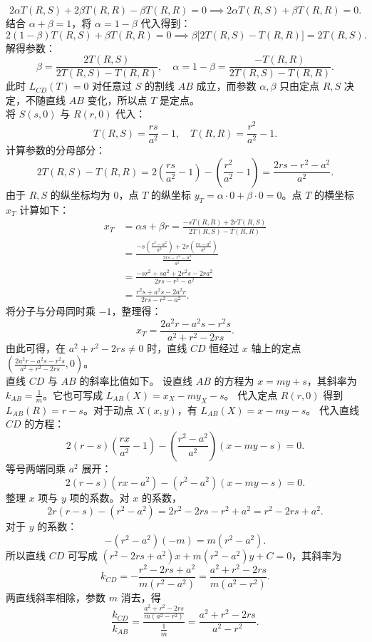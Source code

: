 \begin{solution}
\[ 2\alpha T(R, S) + 2\beta T(R, R) - \beta T(R, R) = 0 \implies 2\alpha T(R, S) + \beta T(R, R) = 0. \]
结合 $\alpha + \beta = 1$，将 $\alpha = 1 - \beta$ 代入得到：
\[ 2(1 - \beta) T(R, S) + \beta T(R, R) = 0 \implies \beta \big[2T(R, S) - T(R, R)\big] = 2T(R, S). \]
解得参数：
\[ \beta = \frac{2T(R, S)}{2T(R, S) - T(R, R)}, \quad \alpha = 1 - \beta = \frac{-T(R, R)}{2T(R, S) - T(R, R)}. \]
此时 $L_{CD}(T)=0$ 对任意过 $S$ 的割线 $AB$ 成立，而参数 $\alpha,\beta$ 只由定点 $R,S$ 决定，不随直线 $AB$ 变化，所以点 $T$ 是定点。\\
将 $S(s, 0)$ 与 $R(r, 0)$ 代入：
\[ T(R, S) = \frac{rs}{a^2} - 1, \quad T(R, R) = \frac{r^2}{a^2} - 1. \]
计算参数的分母部分：
\[ 2T(R, S) - T(R, R) = 2\left(\frac{rs}{a^2} - 1\right) - \left(\frac{r^2}{a^2} - 1\right) = \frac{2rs - r^2 - a^2}{a^2}. \]
由于 $R, S$ 的纵坐标均为 $0$，点 $T$ 的纵坐标 $y_T = \alpha \cdot 0 + \beta \cdot 0 = 0$。点 $T$ 的横坐标 $x_T$ 计算如下：
\begin{align*}
x_T &= \alpha s + \beta r = \frac{-s T(R, R) + 2r T(R, S)}{2T(R, S) - T(R, R)} \\
&= \frac{-s\left(\frac{r^2 - a^2}{a^2}\right) + 2r\left(\frac{rs - a^2}{a^2}\right)}{\frac{2rs - r^2 - a^2}{a^2}} \\
&= \frac{-sr^2 + sa^2 + 2r^2s - 2ra^2}{2rs - r^2 - a^2} \\
&= \frac{r^2s + a^2s - 2a^2r}{2rs - r^2 - a^2}.
\end{align*}
将分子与分母同时乘 $-1$，整理得：
\[ x_T = \frac{2a^2r - a^2s - r^2s}{a^2 + r^2 - 2rs}. \]
由此可得，在 $a^2 + r^2 - 2rs \neq 0$ 时，直线 $CD$ 恒经过 $x$ 轴上的定点 $\left( \frac{2a^2r - a^2s - r^2s}{a^2 + r^2 - 2rs}, 0 \right)$。\\
直线 $CD$ 与 $AB$ 的斜率比值如下。
设直线 $AB$ 的方程为 $x = my + s$，其斜率为 $k_{AB} = \frac{1}{m}$。它也可写成 $L_{AB}(X) = x_X - m y_X - s$。
代入定点 $R(r, 0)$ 得到 $L_{AB}(R) = r - s$。对于动点 $X(x, y)$，有 $L_{AB}(X) = x - my - s$。
代入直线 $CD$ 的方程：
\[ 2(r - s)\left(\frac{rx}{a^2} - 1\right) - \left(\frac{r^2 - a^2}{a^2}\right)(x - my - s) = 0. \]
等号两端同乘 $a^2$ 展开：
\[ 2(r - s)(rx - a^2) - (r^2 - a^2)(x - my - s) = 0. \]
整理 $x$ 项与 $y$ 项的系数。对 $x$ 的系数，
\[ 2r(r - s) - (r^2 - a^2) = 2r^2 - 2rs - r^2 + a^2 = r^2 - 2rs + a^2. \]
对于 $y$ 的系数：
\[ -(r^2 - a^2)(-m) = m(r^2 - a^2). \]
所以直线 $CD$ 可写成 $(r^2 - 2rs + a^2)x + m(r^2 - a^2)y + C = 0$，其斜率为
\[ k_{CD} = -\frac{r^2 - 2rs + a^2}{m(r^2 - a^2)} = \frac{a^2 + r^2 - 2rs}{m(a^2 - r^2)}. \]
两直线斜率相除，参数 $m$ 消去，得
\[ \frac{k_{CD}}{k_{AB}} = \frac{\frac{a^2 + r^2 - 2rs}{m(a^2 - r^2)}}{\frac{1}{m}} = \frac{a^2 + r^2 - 2rs}{a^2 - r^2}. \]

\end{solution}


